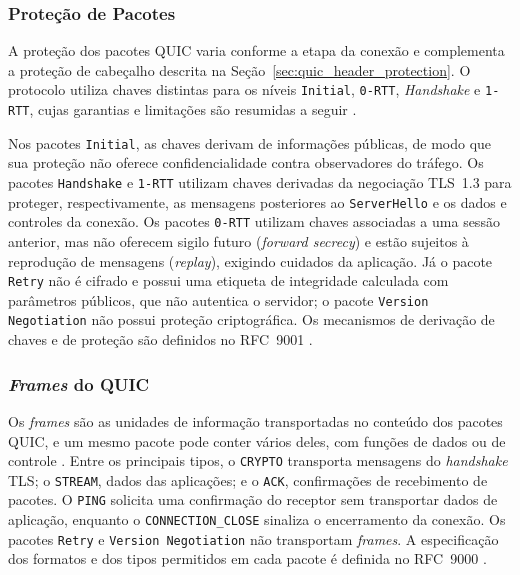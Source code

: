\subsubsection{Proteção de Pacotes}
\label{sec:quic_packet_protection}

A proteção dos pacotes QUIC varia conforme a etapa da conexão e complementa a proteção de cabeçalho descrita na Seção~\ref{sec:quic_header_protection}. O protocolo utiliza chaves distintas para os níveis \texttt{Initial}, \texttt{0-RTT}, \textit{Handshake} e \texttt{1-RTT}, cujas garantias e limitações são resumidas a seguir \citep{rfc9001}.

Nos pacotes \texttt{Initial}, as chaves derivam de informações públicas, de modo que sua proteção não oferece confidencialidade contra observadores do tráfego. Os pacotes \texttt{Handshake} e \texttt{1-RTT} utilizam chaves derivadas da negociação TLS~1.3 para proteger, respectivamente, as mensagens posteriores ao \texttt{ServerHello} e os dados e controles da conexão. Os pacotes \texttt{0-RTT} utilizam chaves associadas a uma sessão anterior, mas não oferecem sigilo futuro (\textit{forward secrecy}) e estão sujeitos à reprodução de mensagens (\textit{replay}), exigindo cuidados da aplicação. Já o pacote \texttt{Retry} não é cifrado e possui uma etiqueta de integridade calculada com parâmetros públicos, que não autentica o servidor; o pacote \texttt{Version Negotiation} não possui proteção criptográfica. Os mecanismos de derivação de chaves e de proteção são definidos no RFC~9001 \citep{rfc9001}.

\subsubsection{\textit{Frames} do QUIC}

Os \textit{frames} são as unidades de informação transportadas no conteúdo dos pacotes QUIC, e um mesmo pacote pode conter vários deles, com funções de dados ou de controle \citep{rfc9000}. Entre os principais tipos, o \texttt{CRYPTO} transporta mensagens do \textit{handshake} TLS; o \texttt{STREAM}, dados das aplicações; e o \texttt{ACK}, confirmações de recebimento de pacotes. O \texttt{PING} solicita uma confirmação do receptor sem transportar dados de aplicação, enquanto o \texttt{CONNECTION\_\allowbreak{}CLOSE} sinaliza o encerramento da conexão. Os pacotes \texttt{Retry} e \texttt{Version Negotiation} não transportam \textit{frames}. A especificação dos formatos e dos tipos permitidos em cada pacote é definida no RFC~9000 \citep{rfc9000}.

